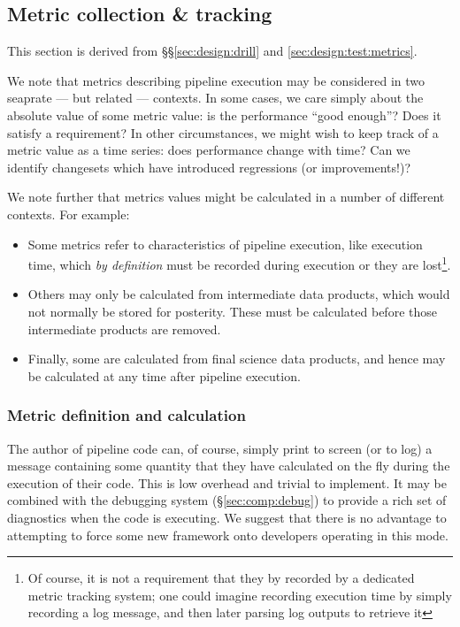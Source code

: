 \subsection{Metric collection \& tracking}
\label{sec:comp:metric}

This section is derived from \S\S\ref{sec:design:drill} and \ref{sec:design:test:metrics}.

We note that metrics describing pipeline execution may be considered in two seaprate --- but related --- contexts.
In some cases, we care simply about the absolute value of some metric value: is the performance ``good enough''?
Does it satisfy a requirement?
In other circumstances, we might wish to keep track of a metric value as a time series: does performance change with time?
Can we identify changesets which have introduced regressions (or improvements!)?

We note further that metrics values might be calculated in a number of different contexts.
For example:

\begin{itemize}

  \item{Some metrics refer to characteristics of pipeline execution, like execution time, which \emph{by definition} must be recorded during execution or they are lost\footnote{Of course, it is not a requirement that they by recorded by a dedicated metric tracking system; one could imagine recording execution time by simply recording a log message, and then later parsing log outputs to retrieve it}.}

  \item{Others may only be calculated from intermediate data products, which would not normally be stored for posterity. These must be calculated before those intermediate products are removed.}

  \item{Finally, some are calculated from final science data products, and hence may be calculated at any time after pipeline execution.}

\end{itemize}

\subsubsection{Metric definition and calculation}
\label{sec:comp:metric:define}

The author of pipeline code can, of course, simply print to screen (or to log) a message containing some quantity that they have calculated on the fly during the execution of their code.
This is low overhead and trivial to implement.
It may be combined with the debugging system (\S\ref{sec:comp:debug}) to provide a rich set of diagnostics when the code is executing.
We suggest that there is no advantage to attempting to force some new framework onto developers operating in this mode.

